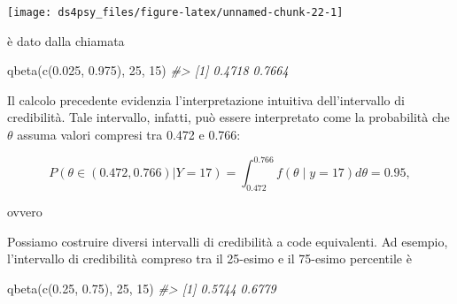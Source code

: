 \documentclass[
  11pt,
]{krantz}
\makeatletter
\newenvironment{Shaded}{\begin{snugshade}}{\end{snugshade}}
\newcommand{\AttributeTok}[1]{\textcolor[rgb]{0.61,0.61,0.61}{#1}}
\newcommand{\CommentTok}[1]{\textcolor[rgb]{0.37,0.37,0.37}{\textit{#1}}}
\newcommand{\ControlFlowTok}[1]{\textcolor[rgb]{0.27,0.27,0.27}{\textbf{#1}}}
\newcommand{\DecValTok}[1]{\textcolor[rgb]{0.06,0.06,0.06}{#1}}
\newcommand{\FloatTok}[1]{\textcolor[rgb]{0.06,0.06,0.06}{#1}}
\newcommand{\FunctionTok}[1]{\textcolor[rgb]{0,0,0}{#1}}
\newcommand{\NormalTok}[1]{#1}
\newcommand{\OtherTok}[1]{\textcolor[rgb]{0.37,0.37,0.37}{#1}}
\newcommand{\SpecialCharTok}[1]{\textcolor[rgb]{0,0,0}{#1}}
\newenvironment{kframe}{%
\medskip{}
\setlength{\fboxsep}{.8em}
 \def\at@end@of@kframe{}%
 \ifinner\ifhmode%
  \def\at@end@of@kframe{\end{minipage}}%
  \begin{minipage}{\columnwidth}%
 \fi\fi%
 \def\FrameCommand##1{\hskip\@totalleftmargin \hskip-\fboxsep
 \colorbox{shadecolor}{##1}\hskip-\fboxsep
     \hskip-\linewidth \hskip-\@totalleftmargin \hskip\columnwidth}%
 \MakeFramed {\advance\hsize-\width
   \@totalleftmargin\z@ \linewidth\hsize
   \@setminipage}}%
 {\par\unskip\endMakeFramed%
 \at@end@of@kframe}
\renewenvironment{Shaded}{\begin{kframe}}{\end{kframe}}
\theoremstyle{definition}
\theoremstyle{definition}
\theoremstyle{definition}
\theoremstyle{definition}
\theoremstyle{remark}
\makeatother
\begin{document}
\begin{center}\texttt{[image: ds4psy\_files/figure-latex/unnamed-chunk-22-1]} \end{center}

è dato dalla chiamata

\begin{Shaded}
\begin{Highlighting}[]
\FunctionTok{qbeta}\NormalTok{(}\FunctionTok{c}\NormalTok{(}\FloatTok{0.025}\NormalTok{, }\FloatTok{0.975}\NormalTok{), }\DecValTok{25}\NormalTok{, }\DecValTok{15}\NormalTok{)}
\CommentTok{\#\textgreater{} [1] 0.4718 0.7664}
\end{Highlighting}
\end{Shaded}

Il calcolo precedente evidenzia l'interpretazione intuitiva dell'intervallo di credibilità. Tale intervallo, infatti, può essere interpretato come la probabilità che \(\theta\) assuma valori compresi tra 0.472 e 0.766:

\[
P(\theta \in (0.472, 0.766) | Y = 17) = \int_{0.472}^{0.766} f(\theta \mid y=17) d\theta = 0.95,
\]

ovvero

\begin{Shaded}
\end{Shaded}

Possiamo costruire diversi intervalli di credibilità a code equivalenti. Ad esempio, l'intervallo di credibilità compreso tra il 25-esimo e il 75-esimo percentile è

\begin{Shaded}
\begin{Highlighting}[]
\FunctionTok{qbeta}\NormalTok{(}\FunctionTok{c}\NormalTok{(}\FloatTok{0.25}\NormalTok{, }\FloatTok{0.75}\NormalTok{), }\DecValTok{25}\NormalTok{, }\DecValTok{15}\NormalTok{)}
\CommentTok{\#\textgreater{} [1] 0.5744 0.6779}
\end{Highlighting}
\end{Shaded}
\end{document}
